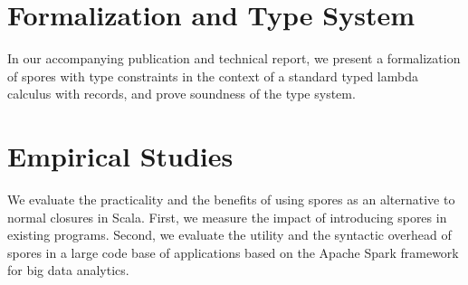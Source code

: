 \documentclass[english]{lni}
\begin{document}





\vspace{-7mm}
\section{Formalization and Type System}
\vspace{-5mm}
In our accompanying publication and technical report,
we present a formalization of spores with type constraints in the context of a
standard typed lambda calculus with records, and prove soundness of the type
system.

\vspace{-7mm}
\section{Empirical Studies}
\vspace{-5mm}
We evaluate the practicality and the benefits of using spores as an
alternative to normal closures in Scala. First, we measure the impact of
introducing spores in existing programs. Second, we evaluate the utility
and the syntactic overhead of spores in a large code base of applications
based on the Apache Spark framework for big data analytics.
\end{document}
